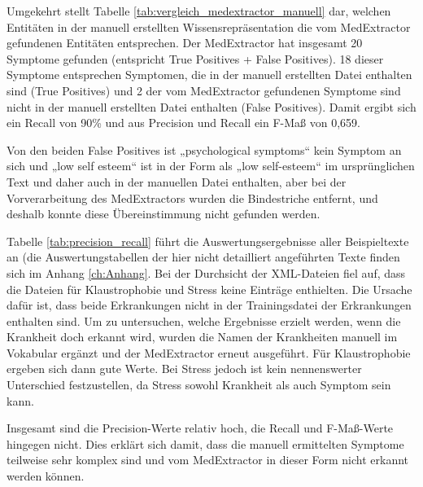 Umgekehrt stellt Tabelle \ref{tab:vergleich_medextractor_manuell} dar, welchen Entitäten in der manuell erstellten Wissensrepräsentation die vom MedExtractor gefundenen Entitäten entsprechen. Der MedExtractor hat insgesamt 20 Symptome gefunden (entspricht True Positives + False Positives). 18 dieser Symptome entsprechen Symptomen, die in der manuell erstellten Datei enthalten sind (True Positives) und 2 der vom MedExtractor gefundenen Symptome sind nicht in der manuell erstellten Datei enthalten (False Positives). Damit ergibt sich ein Recall von 90\% und aus Precision und Recall ein F-Maß von 0,659.

Von den beiden False Positives ist „psychological symptoms“ kein Symptom an sich und „low self esteem“ ist in der Form als „low self-esteem“ im ursprünglichen Text und daher auch in der manuellen Datei enthalten, aber bei der Vorverarbeitung des MedExtractors wurden die Bindestriche entfernt, und deshalb konnte diese Übereinstimmung nicht gefunden werden.


Tabelle \ref{tab:precision_recall} führt die Auswertungsergebnisse aller Beispieltexte an (die Auswertungstabellen der hier nicht detailliert angeführten Texte finden sich im Anhang \ref{ch:Anhang}. Bei der Durchsicht der XML-Dateien fiel auf, dass die Dateien für Klaustrophobie und Stress keine Einträge enthielten. Die Ursache dafür ist, dass beide Erkrankungen nicht in der Trainingsdatei der Erkrankungen enthalten sind. Um zu untersuchen, welche Ergebnisse erzielt werden, wenn die Krankheit doch erkannt wird, wurden die Namen der Krankheiten manuell im Vokabular ergänzt und der MedExtractor erneut ausgeführt. Für Klaustrophobie ergeben sich dann gute Werte. Bei Stress jedoch ist kein nennenswerter Unterschied festzustellen, da Stress sowohl Krankheit als auch Symptom sein kann.

Insgesamt sind die Precision-Werte relativ hoch, die Recall und F-Maß-Werte hingegen nicht. Dies erklärt sich damit, dass die manuell ermittelten Symptome teilweise sehr komplex sind und vom MedExtractor in dieser Form nicht erkannt werden können.

